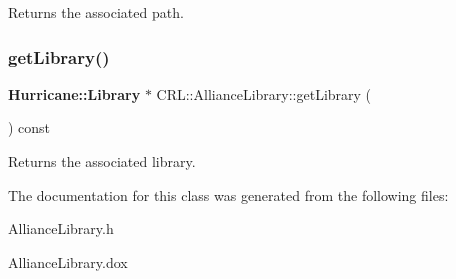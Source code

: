 \begin{DoxyReturn}{Returns}
the associated path. 
\end{DoxyReturn}
\mbox{\label{classCRL_1_1AllianceLibrary_abd54e8a070660030c6d2af8a239359b5}} 
\subsubsection{\texorpdfstring{get\+Library()}{getLibrary()}}
{\footnotesize\ttfamily \textbf{ Hurricane\+::\+Library} $\ast$ C\+R\+L\+::\+Alliance\+Library\+::get\+Library (\begin{DoxyParamCaption}{ }\end{DoxyParamCaption}) const\hspace{0.3cm}{\ttfamily [inline]}}

\begin{DoxyReturn}{Returns}
the associated library. 
\end{DoxyReturn}


The documentation for this class was generated from the following files\+:\begin{DoxyCompactItemize}
\item 
Alliance\+Library.\+h\item 
Alliance\+Library.\+dox\end{DoxyCompactItemize}
